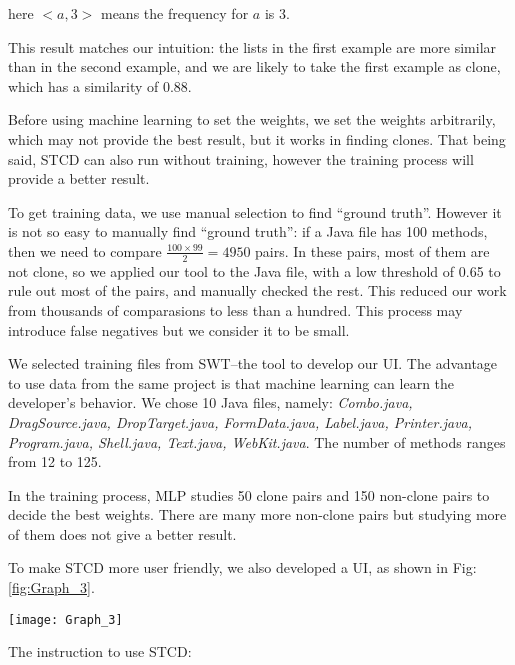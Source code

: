 \documentclass[../main.tex]{subfiles}
\begin{document}
here $<a, 3>$ means the frequency for $a$ is 3.

This result matches our intuition: the lists in the first example are more similar than in the second example, and we are likely to take the first example as clone, which has a similarity of 0.88.

Before using machine learning to set the weights, we set the weights arbitrarily, which may not provide the best result, but it works in finding clones. That being said, STCD can also run without training, however the training process will provide a better result. 

To get training data, we use manual selection to find ``ground truth''. However it is not so easy to manually find ``ground truth'': if a Java file has 100 methods, then we need to compare $\frac{100\times 99}{2} = 4950$ pairs. In these pairs, most of them are not clone, so we applied our tool to the Java file, with a low threshold of 0.65 to rule out most of the pairs, and manually checked the rest. This reduced our work from thousands of comparasions to less than a hundred. This process may introduce false negatives but we consider it to be small.

We selected training files from SWT--the tool to develop our UI. The advantage to use data from the same project is that machine learning can learn the developer's behavior. We chose 10 Java files, namely: \textit{Combo.java, DragSource.java, DropTarget.java, FormData.java, Label.java, Printer.java, Program.java, Shell.java, Text.java, WebKit.java}. The number of methods ranges from 12 to 125.

In the training process, MLP studies 50 clone pairs and 150 non-clone pairs to decide the best weights. There are many more non-clone pairs but studying more of them does not give a better result.

To make STCD more user friendly, we also developed a UI, as shown in Fig:\ref{fig:Graph_3}.

\begin{figure*}
\centering \texttt{[image: Graph\_3]} 
\caption{User Interface} \label{fig:Graph_3}
\end{figure*}

The instruction to use STCD:
\end{document}
